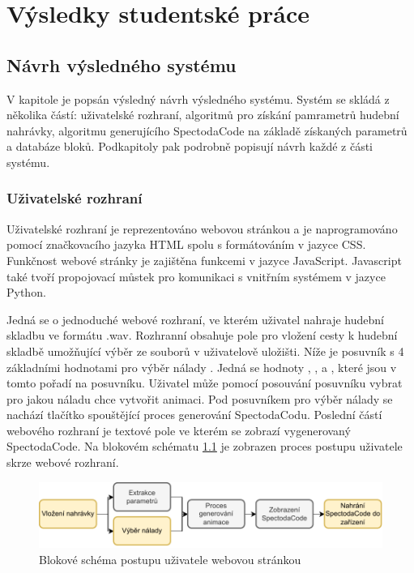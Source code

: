 \chapter{Výsledky studentské práce}



\section{Návrh výsledného systému}


V kapitole je popsán výsledný návrh výsledného systému. Systém se skládá z několika částí: uživatelské rozhraní, algoritmů pro získání pamrametrů hudební nahrávky, algoritmu generujícího SpectodaCode na základě získaných parametrů a databáze bloků. Podkapitoly pak podrobně popisují návrh každé z části systému.

\subsection{Uživatelské rozhraní} \label{sec:User_interface}

Uživatelské rozhraní je reprezentováno webovou stránkou a je naprogramováno pomocí značkovacího jazyka \acs{HTML} spolu s formátováním v jazyce CSS. Funkčnost webové stránky je zajištěna funkcemi v jazyce JavaScript. Javascript také tvoří propojovací můstek pro komunikaci s vnitřním systémem v jazyce Python.

Jedná se o jednoduché webové rozhraní, ve kterém uživatel nahraje hudební skladbu ve formátu .wav. Rozhranní obsahuje pole pro vložení cesty k hudební skladbě umožňující výběr ze souborů v uživatelově uložišti. Níže je posuvník s 4 základními hodnotami pro výběr nálady
. Jedná se hodnoty , ,  a , které jsou v tomto pořadí na posuvníku. Uživatel může pomocí posouvání posuvníku vybrat pro jakou náladu chce vytvořit animaci. Pod posuvníkem pro výběr nálady se nachází tlačítko spouštějící proces generování SpectodaCodu.
Poslední částí webového rozhraní je textové pole ve kterém se zobrazí vygenerovaný SpectodaCode. Na blokovém schématu \ref{fig:User_interaction_diagram} je zobrazen proces postupu uživatele skrze webové rozhraní. 

 \begin{figure}[H]
    \centering
    \includegraphics[width = 1\linewidth]{obrazky/User_interaction_diagram.pdf}
    \caption{Blokové schéma postupu uživatele webovou stránkou}
    \label{fig:User_interaction_diagram}
\end{figure}

